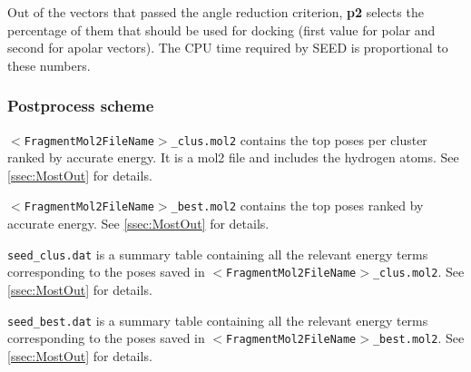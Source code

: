 \documentclass[a4paper,12pt,titlepage]{article}
\begin{document}
\noindent
Out of the vectors that passed the angle reduction criterion, \textbf{p2} selects the percentage of them that should be used for docking (first value for polar and second for apolar vectors). The CPU time required by SEED is proportional to these numbers.


\subsubsection{Postprocess scheme}
\label{sssec:PostproOut}

{\tt $<$FragmentMol2FileName$>$\_clus.mol2} contains the top poses per cluster 
ranked by accurate energy.  It is a mol2 file and includes the hydrogen atoms. See \ref{ssec:MostOut} for details.

\noindent
{\tt $<$FragmentMol2FileName$>$\_best.mol2} contains the top poses 
ranked by accurate energy. See \ref{ssec:MostOut} for details.

\noindent
\texttt{seed\_clus.dat} is a summary table containing all the relevant energy terms corresponding to the poses saved in {\tt $<$FragmentMol2FileName$>$\_clus.mol2}. See \ref{ssec:MostOut} for details.

\noindent
\texttt{seed\_best.dat} is a summary table containing all the relevant energy terms corresponding to the poses saved in {\tt $<$FragmentMol2FileName$>$\_best.mol2}. See \ref{ssec:MostOut} for details.



\end{document}
